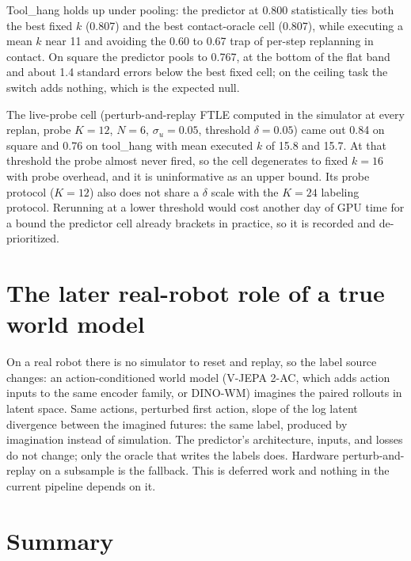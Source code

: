 \documentclass[11pt]{article}
\begin{document}
Tool\_hang holds up under pooling: the predictor at 0.800 statistically ties both
the best fixed $k$ (0.807) and the best contact-oracle cell (0.807), while
executing a mean $k$ near 11 and avoiding the 0.60 to 0.67 trap of per-step
replanning in contact. On square the predictor pools to 0.767, at the bottom of
the flat band and about 1.4 standard errors below the best fixed cell; on the
ceiling task the switch adds nothing, which is the expected null.

The live-probe cell (perturb-and-replay FTLE computed in the simulator at every
replan, probe $K{=}12$, $N{=}6$, $\sigma_u{=}0.05$, threshold $\delta{=}0.05$)
came out 0.84 on square and 0.76 on tool\_hang with mean executed $k$ of 15.8 and
15.7. At that threshold the probe almost never fired, so the cell degenerates to
fixed $k{=}16$ with probe overhead, and it is uninformative as an upper bound.
Its probe protocol ($K{=}12$) also does not share a $\delta$ scale with the
$K{=}24$ labeling protocol. Rerunning at a lower threshold would cost another
day of GPU time for a bound the predictor cell already brackets in practice, so
it is recorded and de-prioritized.

\section{The later real-robot role of a true world model}
\label{sec:later}

On a real robot there is no simulator to reset and replay, so the label source
changes: an action-conditioned world model (V-JEPA 2-AC, which adds action inputs to
the same encoder family, or DINO-WM) imagines the paired rollouts in latent space.
Same actions, perturbed first action, slope of the log latent divergence between the
imagined futures: the same label, produced by imagination instead of simulation. The
predictor's architecture, inputs, and losses do not change; only the oracle that
writes the labels does. Hardware perturb-and-replay on a subsample is the fallback.
This is deferred work and nothing in the current pipeline depends on it.

\section{Summary}
\end{document}
